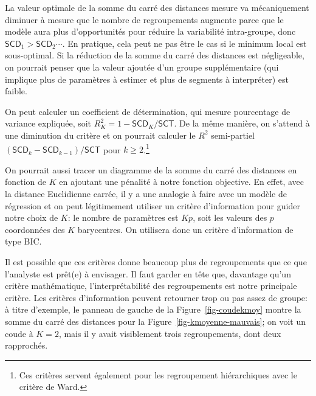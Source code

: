 \documentclass[
  11pt,
  letterpaper,
]{scrbook}
\theoremstyle{definition}
\theoremstyle{remark}
\begin{document}
La valeur optimale de la somme du carré des distances mesure va
mécaniquement diminuer à mesure que le nombre de regroupements augmente
parce que le modèle aura plus d'opportunités pour réduire la variabilité
intra-groupe, donc \(\mathsf{SCD}_1 > \mathsf{SCD}_2 \cdots\). En
pratique, cela peut ne pas être le cas si le minimum local est
sous-optimal. Si la réduction de la somme du carré des distances est
négligeable, on pourrait penser que la valeur ajoutée d'un groupe
supplémentaire (qui implique plus de paramètres à estimer et plus de
segments à interpréter) est faible.

On peut calculer un coefficient de détermination, qui mesure pourcentage
de variance expliquée, soit \(R^2_K = 1-\mathsf{SCD}_K/\mathsf{SCT}\).
De la même manière, on s'attend à une diminution du critère et on
pourrait calculer le \(R^2\) semi-partiel
\((\mathsf{SCD}_{k} - \mathsf{SCD}_{k-1})/\mathsf{SCT}\) pour
\(k \geq 2\).\footnote{Ces critères servent également pour les
  regroupement hiérarchiques avec le critère de Ward.}

On pourrait aussi tracer un diagramme de la somme du carré des distances
en fonction de \(K\) en ajoutant une pénalité à notre fonction
objective. En effet, avec la distance Euclidienne carrée, il y a une
analogie à faire avec un modèle de régression et on peut légitimement
utiliser un critère d'information pour guider notre choix de \(K\): le
nombre de paramètres est \(Kp\), soit les valeurs des \(p\) coordonnées
des \(K\) barycentres. On utilisera donc un critère d'information de
type BIC.

Il est possible que ces critères donne beaucoup plus de regroupements
que ce que l'analyste est prêt(e) à envisager. Il faut garder en tête
que, davantage qu'un critère mathématique, l'interprétabilité des
regroupements est notre principale critère. Les critères d'information
peuvent retourner trop ou pas assez de groupe: à titre d'exemple, le
panneau de gauche de la Figure~\ref{fig-coudekmoy} montre la somme du
carré des distances pour la Figure~\ref{fig-kmoyenne-mauvais}; on voit
un coude à \(K=2\), mais il y avait visiblement trois regroupements,
dont deux rapprochés.
\end{document}
